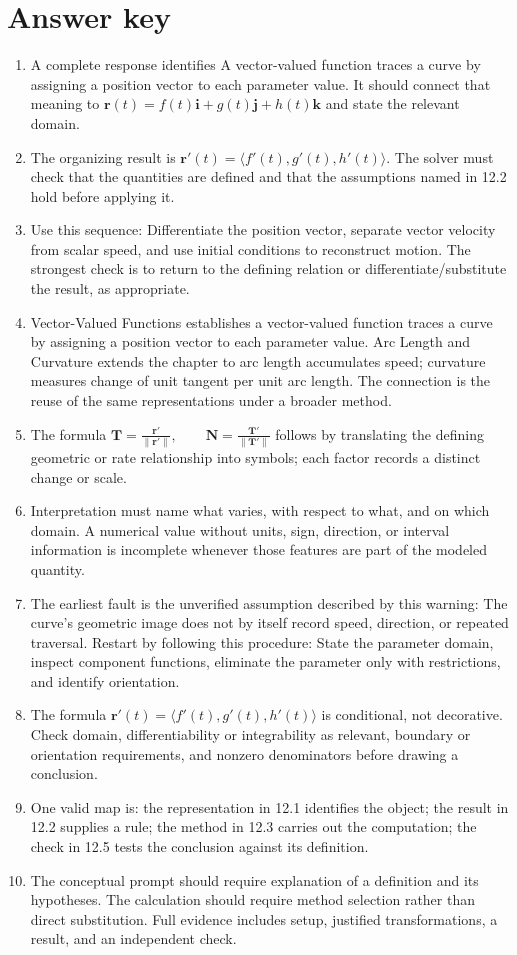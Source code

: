 \documentclass[11pt]{article}
\begin{document}
\section{Answer key}
\small
\begin{enumerate}
\item A complete response identifies A vector-valued function traces a curve by assigning a position vector to each parameter value. It should connect that meaning to \(\mathbf r(t)=f(t)\mathbf i+g(t)\mathbf j+h(t)\mathbf k\) and state the relevant domain.
\item The organizing result is \(\mathbf r'(t)=\langle f'(t),g'(t),h'(t)\rangle\). The solver must check that the quantities are defined and that the assumptions named in 12.2 hold before applying it.
\item Use this sequence: Differentiate the position vector, separate vector velocity from scalar speed, and use initial conditions to reconstruct motion. The strongest check is to return to the defining relation or differentiate/substitute the result, as appropriate.
\item Vector-Valued Functions establishes a vector-valued function traces a curve by assigning a position vector to each parameter value. Arc Length and Curvature extends the chapter to arc length accumulates speed; curvature measures change of unit tangent per unit arc length. The connection is the reuse of the same representations under a broader method.
\item The formula \(\mathbf T=\frac{\mathbf r'}{\|\mathbf r'\|},\qquad \mathbf N=\frac{\mathbf T'}{\|\mathbf T'\|}\) follows by translating the defining geometric or rate relationship into symbols; each factor records a distinct change or scale.
\item Interpretation must name what varies, with respect to what, and on which domain. A numerical value without units, sign, direction, or interval information is incomplete whenever those features are part of the modeled quantity.
\item The earliest fault is the unverified assumption described by this warning: The curve's geometric image does not by itself record speed, direction, or repeated traversal. Restart by following this procedure: State the parameter domain, inspect component functions, eliminate the parameter only with restrictions, and identify orientation.
\item The formula \(\mathbf r'(t)=\langle f'(t),g'(t),h'(t)\rangle\) is conditional, not decorative. Check domain, differentiability or integrability as relevant, boundary or orientation requirements, and nonzero denominators before drawing a conclusion.
\item One valid map is: the representation in 12.1 identifies the object; the result in 12.2 supplies a rule; the method in 12.3 carries out the computation; the check in 12.5 tests the conclusion against its definition.
\item The conceptual prompt should require explanation of a definition and its hypotheses. The calculation should require method selection rather than direct substitution. Full evidence includes setup, justified transformations, a result, and an independent check.
\end{enumerate}
\end{document}
